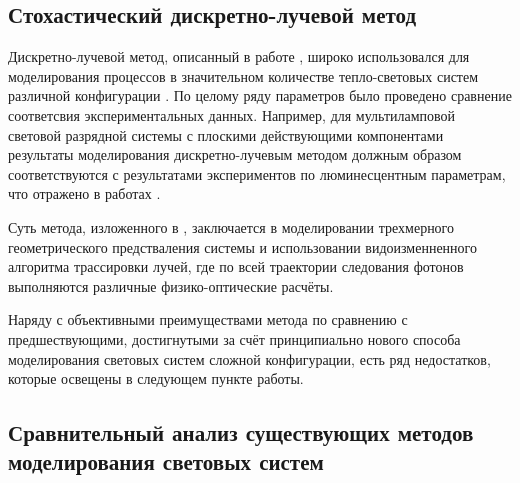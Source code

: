 \subsection{Стохастический дискретно-лучевой метод}

Дискретно-лучевой метод, описанный в работе \cite{gradov-dissertation}, широко использовался для моделирования процессов в значительном количестве тепло-световых систем различной конфигурации \cite{gradov-machine-modeling}.
По целому ряду параметров было проведено сравнение соответсвия экспериментальных данных.
Например, для мультиламповой световой разрядной системы с плоскими действующими компонентами результаты моделирования дискретно-лучевым методом должным образом соответствуются с результатами экспериментов по люминесцентным пара­метрам, что отражено в работах \cite{gradov-calculation-methods, gradov-machine-modeling}.

Суть метода, изложенного в \cite{gradov-dissertation}, заключается в моделировании трехмерного геометрического предстваления системы и использовании видоизменненного алгоритма трассировки лучей, где по всей траектории следования фотонов выполняются различные физико-оптические расчёты.

Наряду с объективными преимуществами метода по сравнению с предшествующими, достигнутыми за счёт принципиально нового способа моделирования световых систем сложной конфигурации, есть ряд недостатков, которые освещены в следующем пункте работы.

\subsection{Сравнительный анализ существующих методов моделирования световых систем}

